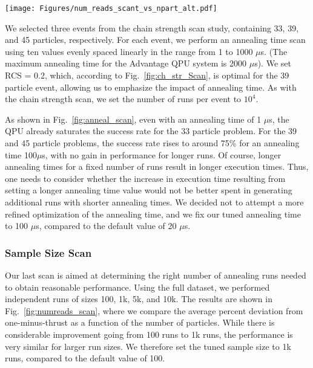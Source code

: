 \documentclass[aps,prd,twocolumn,superscriptaddress,preprintnumbers,nofootinbib,longbibliography,floatfix]{revtex4-1}
\DeclareRobustCommand{\Fig}[1]{Fig.~\ref{fig:#1}}
\begin{document}
\begin{figure*}[t]
\centering
\texttt{[image: Figures/num\_reads\_scant\_vs\_npart\_alt.pdf]}\\
\caption{
%
Average percentage deviation from $1 - T$ as a function of number of particles in the event, acting on the full dataset, for increasing number of annealing samples: 100 (fuchsia), 1,000 (green), 5,000 (red), and 10,000 (blue).
%
For each problem, the RCS was set to $0.2$ and the annealing time to 100 $\mu$s.}
\label{fig:numreads_scan}
\end{figure*}

We selected three events from the chain strength scan study, containing 33, 39, and 45 particles, respectively.
%
For each event, we perform an annealing time scan using ten values evenly spaced linearly in the range from 1 to 1000 $\mu$s.
%
(The maximum annealing time for the Advantage QPU system is 2000 $\mu$s).
%
We set RCS = 0.2, which, according to \Fig{ch_str_Scan}, is optimal for the 39 particle event, allowing us to emphasize the impact of annealing time.
%
As with the chain strength scan, we set the number of runs per event to $10^{4}$.


As shown in \Fig{anneal_scan}, even with an annealing time of 1 $\mu$s, the QPU already saturates the success rate for the 33 particle problem.
%
For the 39 and 45 particle problems, the success rate rises to around 75\% for an annealing time 100$\mu$s, with no gain in performance for longer runs.
%
Of course, longer annealing times for a fixed number of runs result in longer execution times.
%
Thus, one needs to consider whether the increase in execution time resulting from setting a longer annealing time value would not be better spent in generating additional runs with shorter annealing times.
%
We decided not to attempt a more refined optimization of the annealing time, and we fix our tuned annealing time to 100 $\mu$s, compared to the default value of 20 $\mu$s.


\subsubsection{Sample Size Scan}




Our last scan is aimed at determining the right number of annealing runs needed to obtain reasonable performance.
%
Using the full dataset, we performed independent runs of sizes 100, 1k, 5k, and 10k.
%
The results are shown in \Fig{numreads_scan}, where we compare the average percent deviation from one-minus-thrust as a function of the number of particles.
%
While there is considerable improvement going from 100 runs to 1k runs, the performance is very similar for larger run sizes.
%
We therefore set the tuned sample size to 1k runs, compared to the default value of 100.
\end{document}
